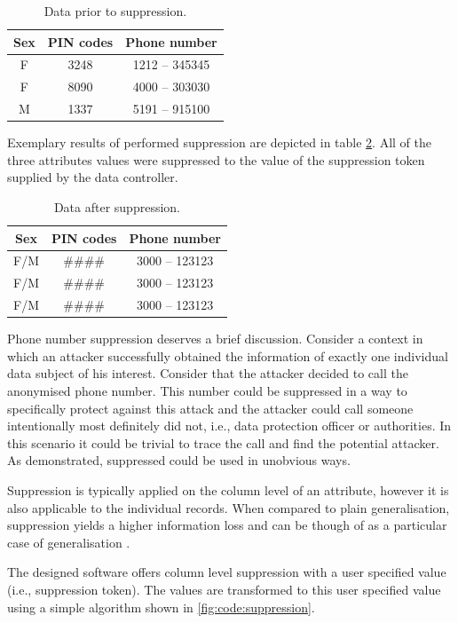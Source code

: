 \documentclass[a4paper,twoside,12pt]{book}
\begin{document}
\begin{table}[h]
\centering
\caption{Data prior to suppression.}
\label{id:tab:suppression_raw}
\begin{tabular}{ccc}
\toprule
Sex & \multicolumn{1}{l}{PIN codes} & Phone number \\ \hline
F   & 3248                          & 1212 – 345345  \\
F   & 8090                          & 4000 – 303030  \\
M   & 1337                          & 5191 – 915100 
\end{tabular}
\end{table}

Exemplary results of performed suppression are depicted in table \ref{id:tab:suppression}. All of the three attributes values were suppressed to the value of the suppression token supplied by the data controller.

\begin{table}[h]
\centering
\caption{Data after suppression.}
\label{id:tab:suppression}
\begin{tabular}{ccc}
\toprule
Sex & PIN codes & Phone number \\ \hline
F/M & \#\#\#\#  & 3000 – 123123  \\
F/M & \#\#\#\#  & 3000 – 123123  \\
F/M & \#\#\#\#  & 3000 – 123123
\end{tabular}
\end{table}

Phone number suppression deserves a brief discussion. Consider a context in which an attacker successfully obtained the information of exactly one individual data subject of his interest. Consider that the attacker decided to call the anonymised phone number. This number could be suppressed in a way to specifically protect against this attack and the attacker could call someone intentionally most definitely did not, i.e., data protection officer or authorities. In this scenario it could be trivial to trace the call and find the potential attacker. As demonstrated, suppressed could be used in unobvious ways.

Suppression is typically applied on the column level of an attribute, however it is also applicable to the individual records. When compared to plain generalisation, suppression yields a higher information loss and can be though of as a particular case of generalisation \cite{bib:anonymization_emr}. 

The designed software offers column level suppression with a user specified value (i.e., suppression token). The values are transformed to this user specified value using a simple algorithm shown in \ref{fig:code:suppression}.
\end{document}
